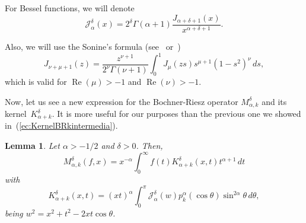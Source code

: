 \documentclass{amsart}
\newtheorem{lem}{Lemma}
\theoremstyle{remark}
\renewcommand{\Re}{\operatorname{Re}}
\newcommand{\Jad}[1][\delta]{\mathcal{J}_{\alpha}^{#1}}
\newcommand{\BRk}{M_{\alpha,k}^{\delta}}
\newcommand{\KBRk}{K_{\alpha+k}^{\delta}} %
\begin{document}
For Bessel functions, we will denote
\begin{equation}
\label{ec:jad}
    \Jad(x) = 2^\delta \Gamma(\alpha+1)
       \frac{J_{\alpha+\delta+1}(x)}{x^{\alpha+\delta+1}}.
\end{equation}

Also, we will use the Sonine's formula
(see~\cite[\S~12.11, p.~373]{Wat} or~\cite[Lemma~4.13]{StWe})
\begin{equation}
\label{ec:sonine}
    J_{\nu+\mu+1}(z)
    = \frac{z^{\nu+1}}{2^{\nu}\Gamma(\nu+1)}
      \int_0^1 J_{\mu}(zs) s^{\mu+1}(1-s^2)^{\nu} \, ds,
\end{equation}
which is valid for $\Re(\mu)>-1$ and $\Re(\nu)>-1$.

Now, let us see a new expression for the Bochner-Riesz
operator $\BRk$ and its kernel~$\KBRk$. It is more useful for our purposes
than the previous one we showed in~(\ref{ec:KernelBRkintermedia}).

\begin{lem}
\label{lem:Kernel}
Let $\alpha>-1/2$ and $\delta>0$. Then,
\begin{equation*}
    \BRk(f,x)
    = x^{-\alpha} \int_0^{\infty} f(t) \KBRk(x,t) t^{\alpha+1} \, dt
\end{equation*}
with
\begin{equation}
\label{ec:KernelBRk}
    \KBRk(x,t)
    = (xt)^{\alpha} \int_0^{\pi} \Jad(w)
         p^{\alpha}_k(\cos\theta) \sin^{2\alpha}\theta \, d\theta,
\end{equation}
being $w^2 = x^2 + t^2 - 2xt\cos\theta$.
\end{lem}
\end{document}
